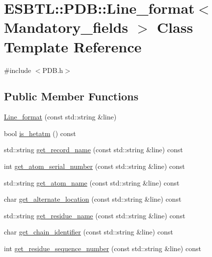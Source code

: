 \hypertarget{classESBTL_1_1PDB_1_1Line__format}{}\section{E\+S\+B\+TL\+:\+:P\+DB\+:\+:Line\+\_\+format$<$ Mandatory\+\_\+fields $>$ Class Template Reference}
\label{classESBTL_1_1PDB_1_1Line__format}


{\ttfamily \#include $<$P\+D\+B.\+h$>$}

\subsection*{Public Member Functions}
\begin{DoxyCompactItemize}
\item 
\hyperlink{classESBTL_1_1PDB_1_1Line__format_aaec07c0a69d03b66c4e9e1662f1cadc9}{Line\+\_\+format} (const std\+::string \&line)
\item 
bool \hyperlink{classESBTL_1_1PDB_1_1Line__format_a5985e9f450070463af32eb5438e6f002}{is\+\_\+hetatm} () const
\item 
std\+::string \hyperlink{classESBTL_1_1PDB_1_1Line__format_a3c79f8cc61a87820457d557ae2e6c62c}{get\+\_\+record\+\_\+name} (const std\+::string \&line) const
\item 
int \hyperlink{classESBTL_1_1PDB_1_1Line__format_a04b1c91a27d0fe31b392ab88f4b1764a}{get\+\_\+atom\+\_\+serial\+\_\+number} (const std\+::string \&line) const
\item 
std\+::string \hyperlink{classESBTL_1_1PDB_1_1Line__format_a15c2f8308e18fc058dd7f3a8697ee34a}{get\+\_\+atom\+\_\+name} (const std\+::string \&line) const
\item 
char \hyperlink{classESBTL_1_1PDB_1_1Line__format_a6e389e51c1fc77585024b0cf9f2f4b66}{get\+\_\+alternate\+\_\+location} (const std\+::string \&line) const
\item 
std\+::string \hyperlink{classESBTL_1_1PDB_1_1Line__format_ab0d5125e0fbace190c3f7fabb2eb43e5}{get\+\_\+residue\+\_\+name} (const std\+::string \&line) const
\item 
char \hyperlink{classESBTL_1_1PDB_1_1Line__format_a2db4604a71b9299ec3696d46d1a159bc}{get\+\_\+chain\+\_\+identifier} (const std\+::string \&line) const
\item 
int \hyperlink{classESBTL_1_1PDB_1_1Line__format_a942dc2b1288d12b5a9b5e49ce4eb0371}{get\+\_\+residue\+\_\+sequence\+\_\+number} (const std\+::string \&line) const

\end{DoxyCompactItemize}
